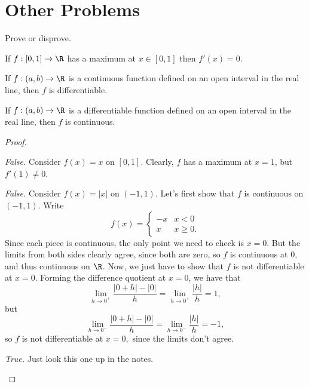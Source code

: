 \documentclass{assignment}
\begin{document}
\section*{Other Problems}
\begin{question}[1]
  Prove or disprove.
  \begin{qparts}
    \item If $f: [0,1] \to \R$ has a maximum at $x\in [0,1]$ then $f'(x) = 0$.
    \item If $f: (a,b) \to \R$ is a continuous function defined on an open interval in the real
line, then $f$ is differentiable.
    \item If $f: (a,b) \to \R$ is a differentiable function defined on an open interval in the real
line, then $f$ is continuous.
  \end{qparts}
\end{question}
\begin{proof}\leavevmode
 \begin{qparts}
   \item \emph{False.} Consider $f(x) = x$ on $[0,1]$. Clearly, $f$ has a maximum at $x = 1$, but
$f'(1) \neq 0$.
   \item \emph{False.} Consider $f(x) = |x|$ on $(-1,1)$. Let's first show that $f$ is continuous on
$(-1,1)$. Write $$f(x) = \begin{cases} -x &x < 0 \\ x & x \geq 0. \end{cases}$$ Since each piece is
continuous, the only point we need to check is $x = 0$. But the limits from both sides clearly
agree, since both are zero, so $f$ is continuous at $0$, and thus continuous on $\R$. Now, we just
have to show that $f$ is not differentiable at $x = 0$. Forming the difference quotient at $x=0$, we
have that 
$$\lim_{h\to 0^+} \frac{|0 + h| - |0|}{h} = \lim_{h\to 0^+} \frac{|h|}{h} = 1,$$ but 
$$\lim_{h\to 0^-} \frac{|0 + h| - |0|}{h} = \lim_{h\to 0^-} \frac{|h|}{h} = -1,$$ so $f$ is not
differentiable at $x=0,$ since the limits don't agree.
   \item \emph{True.} Just look this one up in the notes.
 
 \end{qparts} 
\end{proof}
\end{document}
